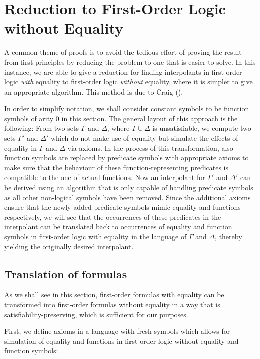 \chapter{Reduction to First-Order Logic without Equality}

A common theme of proofs is to avoid the tedious effort of proving the result from first principles by reducing the problem to one that is easier to solve.
In this instance, we are able to give a reduction for finding interpolants in first-order logic \emph{with} equality to first-order logic \emph{without} equality, where it is simpler to give an appropriate algorithm.
This method is due to Craig (\cite{Craig57linear,Craig57three}).

In order to simplify notation, we shall consider constant symbols to be function symbols of arity $0$ in this section.
The general layout of this approach is the following:
From two sets $\Gamma$ and $\Delta$, where $\Gamma \cup \Delta$ is unsatisfiable, we compute two sets $\Gamma'$ and $\Delta'$ which do not make use of equality but simulate the effects of equality in $\Gamma$ and $\Delta$ via axioms.
In the process of this transformation, also function symbols are replaced by predicate symbols with appropriate axioms to make sure that the behaviour of these function-representing predicates is compatible to the one of actual functions.
Now an interpolant for $\Gamma'$ and $\Delta'$ can be derived using an algorithm that is only capable of handling predicate symbols as all other non-logical symbols have been removed.
Since the additional axioms ensure that the newly added predicate symbols mimic equality and functions respectively, we will see that the occurrences of these predicates in the interpolant can be translated back to occurrences of equality and function symbols in first-order logic with equality in the language of $\Gamma$ and $\Delta$, thereby yielding the originally desired interpolant.


\section{Translation of formulas}

As we shall see in this section, first-order formulas with equality can be transformed into first-order formulas without equality in a way that is satisfiability-preserving, which is sufficient for our purposes.

First, we define axioms in a language with fresh symbols which allows for simulation of equality and functions in first-order logic without equality and function symbols:

